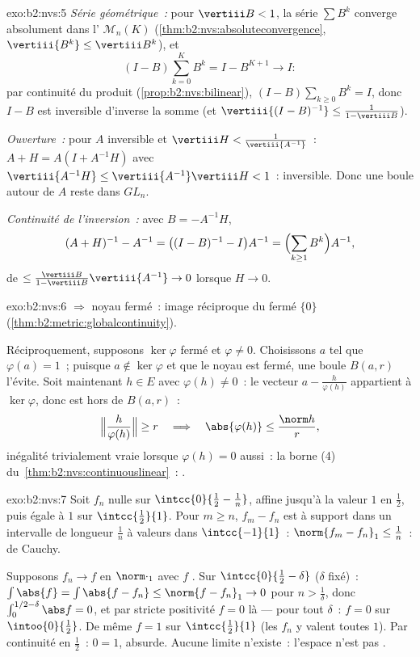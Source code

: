 \begin{solution}{exo:b2:nvs:5}
\emph{Série géométrique~:} pour $\vertiii B < 1$, la série $\sum
B^k$ converge absolument dans l' $\mathcal{M}_n(K)$
(\cref{thm:b2:nvs:absoluteconvergence}, $\vertiii{B^k} \leq
\vertiii B^k$), et
\[
(I - B)\sum_{k=0}^{K} B^k = I - B^{K+1} \longrightarrow I :
\]
par continuité du produit
(\cref{prop:b2:nvs:bilinear}), $(I - B)\sum_{k\geq0} B^k = I$, donc
$I - B$ est inversible d'inverse la somme (et
$\vertiii{(I-B)^{-1}} \leq \frac{1}{1 - \vertiii B}$).

\emph{Ouverture~:} pour $A$ inversible et $\vertiii H <
\frac{1}{\vertiii{A^{-1}}}$~: $A + H = A(I + A^{-1}H)$ avec
$\vertiii{A^{-1}H} \leq \vertiii{A^{-1}}\vertiii H < 1$~: inversible.
Donc une boule autour de $A$ reste dans $GL_n$.

\emph{Continuité de l'inversion~:} avec $B = -A^{-1}H$,
\[
(A + H)^{-1} - A^{-1} = \bigl((I - B)^{-1} - I\bigr)A^{-1}
= \Bigl(\sum_{k \geq 1} B^k\Bigr) A^{-1},
\]
de  $\leq \frac{\vertiii B}{1 - \vertiii B}\vertiii{A^{-1}}
\to 0$ lorsque $H \to 0$.
\end{solution}

\begin{solution}{exo:b2:nvs:6}
 $\Rightarrow$ noyau fermé~: image réciproque du fermé
$\{0\}$ (\cref{thm:b2:metric:globalcontinuity}).

Réciproquement, supposons $\ker\varphi$ fermé et $\varphi \neq 0$.
Choisissons $a$ tel que $\varphi(a) = 1$~; puisque $a \notin \ker\varphi$
et que le noyau est fermé, une boule $B(a, r)$ l'évite. Soit maintenant
$h \in E$ avec $\varphi(h) \neq 0$~: le vecteur $a - \frac{h}{\varphi(h)}$
appartient à $\ker\varphi$, donc est hors de $B(a, r)$~:
\[
\Bigl\Vert \frac{h}{\varphi(h)} \Bigr\Vert \geq r
\quad\Longrightarrow\quad
\abs{\varphi(h)} \leq \frac{\norm h}{r},
\]
inégalité trivialement vraie lorsque $\varphi(h) = 0$ aussi~: la borne
(4) du~\cref{thm:b2:nvs:continuouslinear}~: .
\end{solution}

\begin{solution}{exo:b2:nvs:7}
Soit $f_n$ nulle sur $\intcc{0}{\frac12 - \frac1n}$, affine jusqu'à la
valeur $1$ en $\frac12$, puis égale à $1$ sur $\intcc{\frac12}{1}$. Pour $m
\geq n$, $f_m - f_n$ est à support dans un intervalle de longueur
$\frac1n$ à valeurs dans $\intcc{-1}{1}$~: $\norm{f_m - f_n}_1 \leq
\frac1n$~: de Cauchy.

Supposons $f_n \to f$ en $\norm\cdot_1$ avec $f$ . Sur
$\intcc{0}{\frac12 - \delta}$ ($\delta$ fixé)~: $\int \abs{f} =
\int\abs{f - f_n} \leq \norm{f - f_n}_1 \to 0$ pour $n >
\frac1\delta$, donc $\int_0^{1/2 - \delta}\abs f = 0$, et par stricte
positivité $f = 0$ là --- pour tout $\delta$~: $f = 0$ sur
$\intoo{0}{\frac12}$. De même $f = 1$ sur $\intcc{\frac12}{1}$
(les $f_n$ y valent toutes $1$). Par continuité en $\frac12$~: $0 =
1$, absurde. Aucune limite n'existe~: l'espace n'est pas .
\end{solution}

